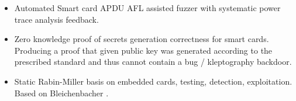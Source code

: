 \documentclass[
  digital, %
  twoside, %
  table,   %
  lof,     %
  lot,     %
]{fithesis3}
\begin{document}
\begin{ecmmnt}
\begin{itemize}
	\item Automated Smart card APDU AFL assisted fuzzer with systematic power trace analysis feedback.
    
    \item Zero knowledge proof of secrets generation correctness for smart cards. Producing a proof that given public key was generated according to the prescribed standard and thus cannot contain a bug / kleptography backdoor. 
    
    \item Static Rabin-Miller basis on embedded cards, testing, detection, exploitation. Based on Bleichenbacher \cite{10.1007/978-3-540-30580-4_2}.
    
\end{itemize}
\end{ecmmnt}
\end{document}
